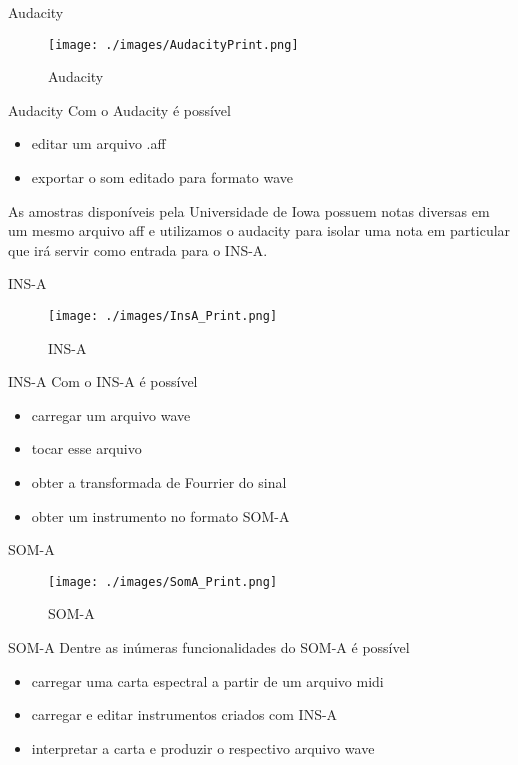 \documentclass{beamer}
\begin{document}
\begin{frame}{Audacity}
\begin{figure}
	\texttt{[image: ./images/AudacityPrint.png]}
	\caption{Audacity}
\end{figure}
\end{frame}

\begin{frame}{Audacity}
	Com o Audacity é possível	
	\begin{itemize}
		\item editar um arquivo .aff
		\item exportar o som editado para formato wave
	\end{itemize}

	As amostras disponíveis pela Universidade de Iowa possuem notas diversas em um mesmo arquivo aff e utilizamos o audacity para isolar uma nota em particular que irá servir como
	entrada para o INS-A.	
\end{frame}

\begin{frame}{INS-A}
\begin{figure}
	\texttt{[image: ./images/InsA\_Print.png]}
	\caption{INS-A}
\end{figure}
\end{frame}

\begin{frame}{INS-A}
	Com o INS-A é possível	
	\begin{itemize}
		\item carregar um arquivo wave
		\item tocar esse arquivo
		\item obter a transformada de Fourrier do sinal
		\item obter um instrumento no formato SOM-A
	\end{itemize}

\end{frame}


\begin{frame}{SOM-A}
\begin{figure}
	\texttt{[image: ./images/SomA\_Print.png]}
	\caption{SOM-A}
\end{figure}
\end{frame}

\begin{frame}{SOM-A}
	Dentre as inúmeras funcionalidades do SOM-A é possível	
	\begin{itemize}
		\item carregar uma carta espectral a partir de um arquivo midi
		\item carregar e editar instrumentos criados com INS-A
		\item interpretar a carta e produzir o respectivo arquivo wave
	\end{itemize}

\end{frame}
\end{document}

